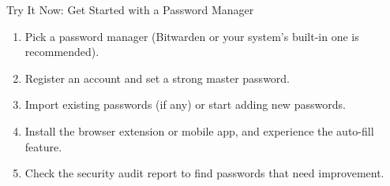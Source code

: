 \begin{tcbpractice}{Try It Now: Get Started with a Password Manager}
\begin{enumerate}
  \item Pick a password manager (Bitwarden or your system’s built-in one is recommended).
  \item Register an account and set a strong master password.
  \item Import existing passwords (if any) or start adding new passwords.
  \item Install the browser extension or mobile app, and experience the auto-fill feature.
  \item Check the security audit report to find passwords that need improvement.
\end{enumerate}

\end{tcbpractice}
